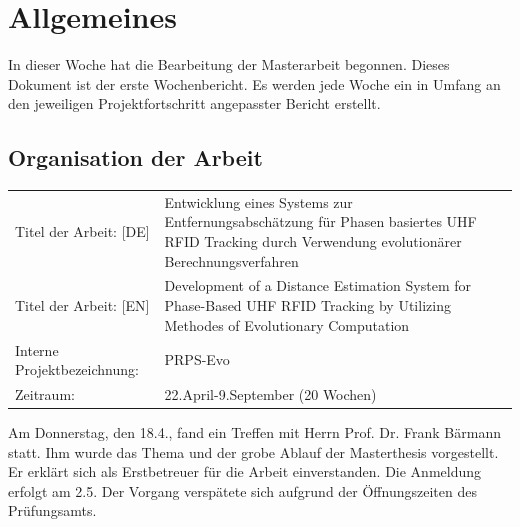 \documentclass[a4paper,12pt,fleqn]{article}
\begin{document}
\setlength{\headheight}{36pt}

\begin{titlepage}





\end{titlepage}
\section[Allgemeines]{Allgemeines}
In dieser Woche hat die Bearbeitung der Masterarbeit begonnen. Dieses Dokument ist der erste Wochenbericht. Es werden jede Woche ein in Umfang an den jeweiligen Projektfortschritt angepasster Bericht erstellt.

\subsection{Organisation der Arbeit}
\begin{table}[right]
    \renewcommand{\arraystretch}{1.5}
    \begin{tabular}{lp{11cm}}
      Titel der Arbeit:  [DE] & Entwicklung eines Systems zur
Entfernungsabschätzung für Phasen basiertes UHF RFID Tracking durch Verwendung
evolutionärer Berechnungsverfahren \\
      Titel der Arbeit:  [EN] & Development of a Distance Estimation System for
Phase-Based UHF RFID Tracking by Utilizing Methodes of Evolutionary Computation
\\
      Interne Projektbezeichnung: & PRPS-Evo      \\
      Zeitraum: & 22.April-9.September (20 Wochen)
    \end{tabular}
\end{table}
%
Am Donnerstag, den 18.4., fand ein Treffen mit Herrn Prof. Dr. Frank Bärmann statt. Ihm wurde das Thema und der grobe Ablauf der Masterthesis vorgestellt.
Er erklärt sich als Erstbetreuer für die Arbeit einverstanden.
Die Anmeldung erfolgt am 2.5. Der Vorgang verspätete sich aufgrund der Öffnungszeiten des Prüfungsamts.
\end{document}
